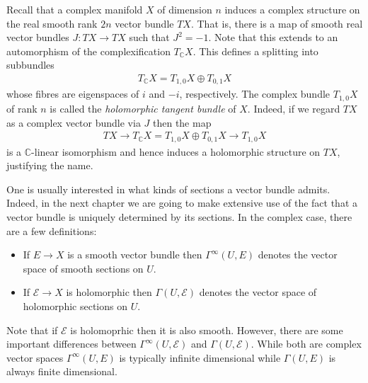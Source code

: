 \documentclass[12pt]{ociamthesis}  %
\begin{document}
\begin{example}
  Recall that a complex manifold $X$ of dimension $n$ induces a
  complex structure on the real smooth rank $2n$ vector bundle $TX$.
  That is, there is a map of smooth real vector bundles
  $J : TX \to TX$ such that $J^2 = -1$. Note that this extends to
  an automorphism of the complexification $T_{\mathbb{C}}X$.
  This defines a splitting into subbundles
  \begin{align}\label{eq:tangent_decomposition}
    T_{\mathbb{C}} X = T_{1,0}X \oplus T_{0,1}X
  \end{align}
  whose fibres are eigenspaces of $i$ and $-i$, respectively. The
  complex bundle $T_{1,0} X$ of rank $n$ is called the
  \emph{holomorphic tangent bundle} of $X$. Indeed, if we regard $TX$
  as a complex vector bundle via $J$ then the map
  \begin{align}\label{eq:holomorphic_tangent_bundle}
    TX
    \longrightarrow T_{\mathbb{C}} X
    = T_{1,0}X \oplus T_{0,1}X
    \longrightarrow T_{1,0}X
  \end{align}
  is a $\mathbb{C}$-linear isomorphism and hence induces a holomorphic
  structure on $TX$, justifying the name.
\end{example}

One is usually interested in what kinds of sections a vector bundle
admits. Indeed, in the next chapter we are going to make extensive use
of the fact that a vector bundle is uniquely determined by its sections.
In the complex case, there are a few definitions:

\begin{definition}
  \begin{itemize}
    \item If $E\to X$ is a smooth vector bundle then $\Gamma^\infty(U,E)$
          denotes the vector space of smooth sections on $U$.
    \item If $\mathcal E\to X$ is holomorphic then $\Gamma(U,\mathcal E)$
          denotes the vector space of holomorphic sections on $U$.
  \end{itemize}
\end{definition}

Note that if $\mathcal E$ is holomoprhic then it is also smooth.
However, there are some important differences between
$\Gamma^\infty(U,\mathcal E)$ and $\Gamma(U,\mathcal E)$. While both are
complex vector spaces $\Gamma^\infty(U,E)$ is typically infinite
dimensional while $\Gamma(U,E)$ is always finite
dimensional.~\cite[Theorem 1.4.1]{ma2007}
\end{document}
